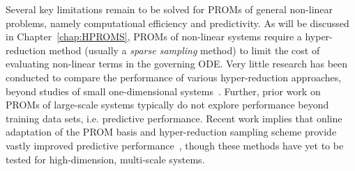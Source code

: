Several key limitations remain to be solved for PROMs of general non-linear problems, namely computational efficiency and predictivity. As will be discussed in Chapter~\ref{chap:HPROMS}, PROMs of non-linear systems require a hyper-reduction method (usually a \textit{sparse sampling} method) to limit the cost of evaluating non-linear terms in the governing ODE. Very little research has been conducted to compare the performance of various hyper-reduction approaches, beyond studies of small one-dimensional systems~\cite{Peherstorfer2020}. Further, prior work on PROMs of large-scale systems typically do not explore performance beyond training data sets, i.e. predictive performance. Recent work implies that online adaptation of the PROM basis and hyper-reduction sampling scheme provide vastly improved predictive performance~\cite{Peherstorfer2022,WayneIsaacTanUy2022}, though these methods have yet to be tested for high-dimension, multi-scale systems.
